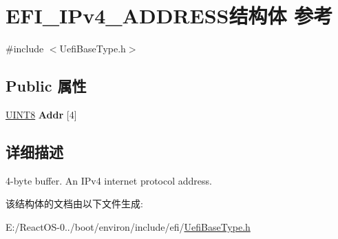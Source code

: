 \hypertarget{struct_e_f_i___i_pv4___a_d_d_r_e_s_s}{}\section{E\+F\+I\+\_\+\+I\+Pv4\+\_\+\+A\+D\+D\+R\+E\+S\+S结构体 参考}
\label{struct_e_f_i___i_pv4___a_d_d_r_e_s_s}


{\ttfamily \#include $<$Uefi\+Base\+Type.\+h$>$}

\subsection*{Public 属性}
\begin{DoxyCompactItemize}
\item 
\mbox{\label{struct_e_f_i___i_pv4___a_d_d_r_e_s_s_aa1ce90812c874685c690fe2e878cc6f3}} 
\hyperlink{_processor_bind_8h_ab27e9918b538ce9d8ca692479b375b6a}{U\+I\+N\+T8} {\bfseries Addr} \mbox{[}4\mbox{]}
\end{DoxyCompactItemize}


\subsection{详细描述}
4-\/byte buffer. An I\+Pv4 internet protocol address. 

该结构体的文档由以下文件生成\+:\begin{DoxyCompactItemize}
\item 
E\+:/\+React\+O\+S-\/0../boot/environ/include/efi/\hyperlink{_uefi_base_type_8h}{Uefi\+Base\+Type.\+h}\end{DoxyCompactItemize}
